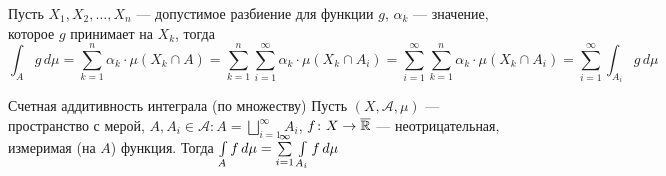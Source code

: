 \begin{prf} Пусть $X_1, X_2, \ldots, X_n$ --- допустимое разбиение для функции $g$, $\alpha_k$ --- значение, которое $g$ принимает на $X_k$, тогда
	\[\int_A g\, d\mu = \sum_{k = 1}^n \alpha_k \cdot \mu(X_k \cap A) = \sum_{k = 1}^n \sum_{i = 1}^\infty \alpha_k \cdot \mu(X_k \cap A_i) = \sum_{i = 1}^\infty \sum_{k = 1}^n \alpha_k \cdot \mu(X_k \cap A_i) = \sum_{i = 1}^\infty \int_{A_i}g \, d\mu\]
\end{prf}

\begin{teor}[https://www.youtube.com/live/fVyBKDoy3EM?si=BsHPBYeMrdkKp5Z7&t=8902]{Счетная аддитивность интеграла (по множеству)}
	Пусть $(X, \mathcal A, \mu)$ --- пространство с мерой, $A, A_i \in \mathcal A : A = \bigsqcup\limits_{i = 1}^\infty A_i$, $f \colon X \to \overline {\mathbb R}$ --- неотрицательная, измеримая (на $A$) функция. Тогда $\int\limits_A f\, d\mu = \raisebox{0pt}[0pt]{$\sum\limits_{i = 1}^\infty$} \int\limits_{A_i}f\,d\mu$ 
\end{teor}

